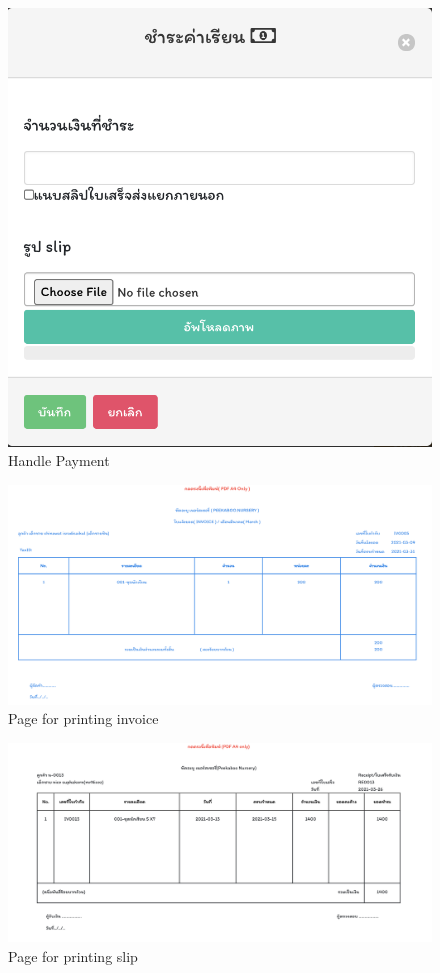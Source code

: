 \begin{figure}
  \begin{center}
  \includegraphics[width=\linewidth]{images/UpdatePayment.png}
  \end{center}
  \caption[Poem]{Handle Payment}
  \label{fig:updatePayment}
  \end{figure}
\begin{figure}
  \begin{center}
  \includegraphics[width=\linewidth]{images/invoicePage.png}
  \end{center}
  \caption[Poem]{Page for printing invoice}
  \label{fig:invoicePage}
  \end{figure}
\begin{figure}
  \begin{center}
  \includegraphics[width=\linewidth]{images/slipPage.png}
  \end{center}
  \caption[Poem]{Page for printing slip}
  \label{fig:slipPage}
  \end{figure}